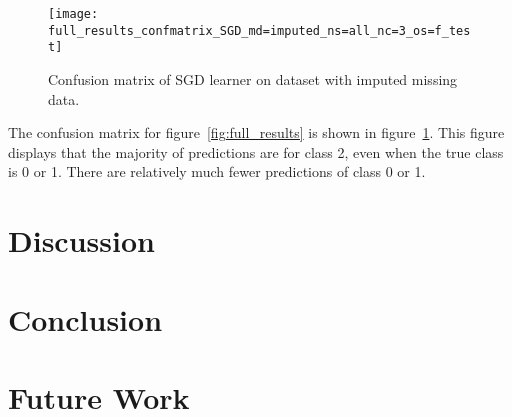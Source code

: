 \documentclass[conference]{IEEEtran}
\begin{document}
\begin{figure}[htpb]
	\centering
	\texttt{[image: full\_results\_confmatrix\_SGD\_md=imputed\_ns=all\_nc=3\_os=f\_test]}
	\caption{Confusion matrix of SGD learner on dataset with imputed missing data.}
	\label{fig:full_results_cm}
\end{figure}

The confusion matrix for figure~\ref{fig:full_results} is shown in figure~\ref{fig:full_results_cm}. This figure displays that the majority of predictions are for class 2, even when the true class is 0 or 1. There are relatively much fewer predictions of class 0 or 1.

\section{Discussion}

\section{Conclusion}

\section{Future Work}



%
\end{document}
